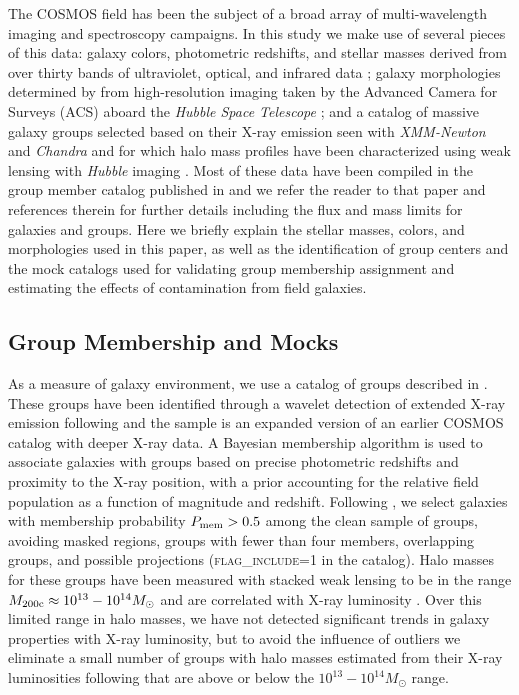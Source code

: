 The COSMOS field \citep{Scoville2007a} has been the subject of a broad
array of multi-wavelength imaging and spectroscopy campaigns. In this
study we make use of several pieces of this data: galaxy colors, photometric redshifts, and stellar
masses derived from over thirty bands of ultraviolet, optical, and
infrared data \citep{Ilbert2009, Ilbert2010, Bundy2010}; galaxy
morphologies determined by \citet{Scarlata2007} from high-resolution imaging taken by the
Advanced Camera for Surveys (ACS) aboard the \textit{Hubble Space
  Telescope} \citep{Koekemoer2007}; and a catalog of massive galaxy
groups selected based on their X-ray emission seen with
\textit{XMM-Newton} and \textit{Chandra} and for which halo mass
profiles have been characterized using weak lensing with
\textit{Hubble} imaging \citep{Leauthaud2010, George2011,
  George2012}. Most of these data have been compiled in the group
member catalog published in \citet{George2011} and we refer the reader
to that paper and references therein for further details including the
flux and mass limits for galaxies and groups. Here we briefly explain
the stellar masses, colors, and morphologies used in this paper, as
well as the identification of group centers and the mock catalogs used
for validating group membership assignment and estimating the effects
of contamination from field galaxies.

\subsection{Group Membership and Mocks}
\label{tran_s:groupdata}

As a measure of galaxy environment, we use a catalog of groups
described in \citet{George2011}. These groups have been identified
through a wavelet detection of extended X-ray emission following
\citet{Finoguenov2010} and the sample is an expanded version of an
earlier COSMOS catalog \citep{Finoguenov2007} with deeper X-ray data.
A Bayesian membership algorithm is used to associate galaxies with
groups based on precise photometric redshifts and proximity to the
X-ray position, with a prior accounting for the relative field
population as a function of magnitude and redshift. Following
\citet{George2011}, we select galaxies with membership probability
$P_{\rm mem}>0.5$ among the clean sample of groups, avoiding masked
regions, groups with fewer than four members, overlapping groups, and
possible projections (\textsc{flag\_include}=1 in the catalog). Halo
masses for these groups have been measured with stacked weak lensing
to be in the range $M_{\rm 200c} \approx 10^{13} - 10^{14} M_{\odot}$
and are correlated with X-ray luminosity \citep{Leauthaud2010,
  George2012}. Over this limited range in halo masses, we have not
detected significant trends in galaxy properties with X-ray
luminosity, but to avoid the influence of outliers we eliminate a
small number of groups with halo masses estimated from
  their X-ray luminosities following \citet{Leauthaud2010} that are
above or below the $10^{13}-10^{14} M_{\odot}$ range.


